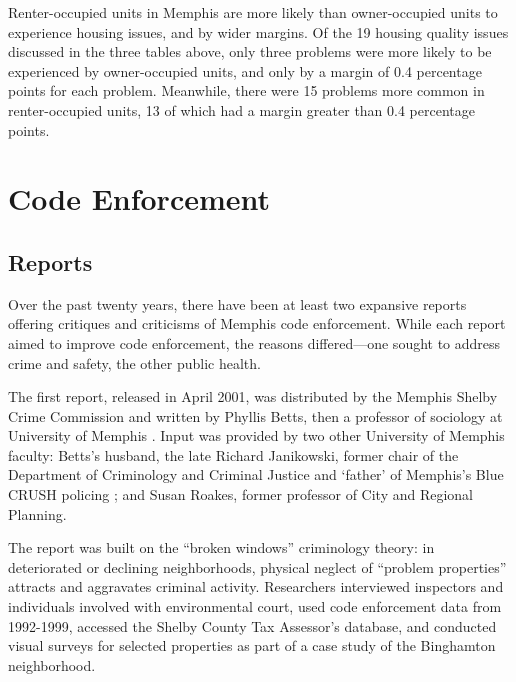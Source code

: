 \documentclass[
]{book}
\begin{document}
Renter-occupied units in Memphis are more likely than owner-occupied units to experience housing issues, and by wider margins. Of the 19 housing quality issues discussed in the three tables above, only three problems were more likely to be experienced by owner-occupied units, and only by a margin of 0.4 percentage points for each problem. Meanwhile, there were 15 problems more common in renter-occupied units, 13 of which had a margin greater than 0.4 percentage points.

\hypertarget{code-enforcement}{%
\chapter{Code Enforcement}\label{code-enforcement}}

\hypertarget{reports}{%
\section{Reports}\label{reports}}

Over the past twenty years, there have been at least two expansive reports offering critiques and criticisms of Memphis code enforcement. While each report aimed to improve code enforcement, the reasons differed---one sought to address crime and safety, the other public health.

The first report, released in April 2001, was distributed by the Memphis Shelby Crime Commission and written by Phyllis Betts, then a professor of sociology at University of Memphis \citep{betts2001}. Input was provided by two other University of Memphis faculty: Betts's husband, the late Richard Janikowski, former chair of the Department of Criminology and Criminal Justice and `father' of Memphis's Blue CRUSH policing \citep{poe2021}; and Susan Roakes, former professor of City and Regional Planning.

The report was built on the ``broken windows'' criminology theory: in deteriorated or declining neighborhoods, physical neglect of ``problem properties'' attracts and aggravates criminal activity. Researchers interviewed inspectors and individuals involved with environmental court, used code enforcement data from 1992-1999, accessed the Shelby County Tax Assessor's database, and conducted visual surveys for selected properties as part of a case study of the Binghamton neighborhood.
\end{document}
